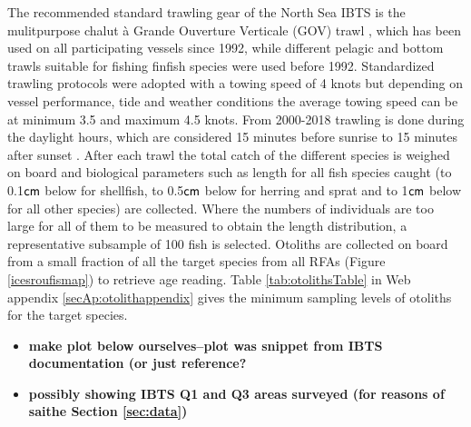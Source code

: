 \documentclass[a4paper 12pt]{article}
\numberwithin{equation}{section}
\newcommand{\cm}{\textnormal{\sffamily cm}\xspace}
\begin{document}
\indent The recommended standard trawling gear of the North Sea IBTS is the mulitpurpose chalut {\`a} Grande Ouverture Verticale (GOV) trawl \citep{ICES2012}, which has been used on all participating vessels since 1992, while different pelagic and bottom trawls suitable for fishing finfish species were used before 1992. Standardized trawling protocols were adopted with a towing speed of 4 knots but depending on vessel performance, tide and weather conditions the average towing speed can be at minimum 3.5 and maximum 4.5 knots. From 2000-2018 trawling is done during the daylight hours, which are considered 15 minutes before sunrise to 15 minutes  after sunset \citep{ICES2012}. After each trawl the total catch of the different species is weighed on board and biological parameters such as length for all fish species caught (to 0.1$\cm$ below for shellfish, to 0.5$\cm$ below for herring and sprat and to 1$\cm$ below for all other species) are collected. Where the numbers of individuals are too large for all of them  to be measured to obtain the length distribution, a representative subsample of 100 fish is selected. Otoliths are collected on board from a small fraction of all the target species from all RFAs (Figure \ref{icesroufismap}) to retrieve age reading. Table \ref{tab:otolithsTable} in Web appendix \ref{secAp:otolithappendix} gives the minimum sampling levels of otoliths for the target species.
\begin{itemize}
\item {\bf make plot below ourselves--plot was snippet from IBTS documentation (or just reference?}
\item {\bf  possibly showing  IBTS Q1 and Q3 areas surveyed (for reasons of saithe Section \ref{sec:data})}
\end{itemize}
\end{document}
